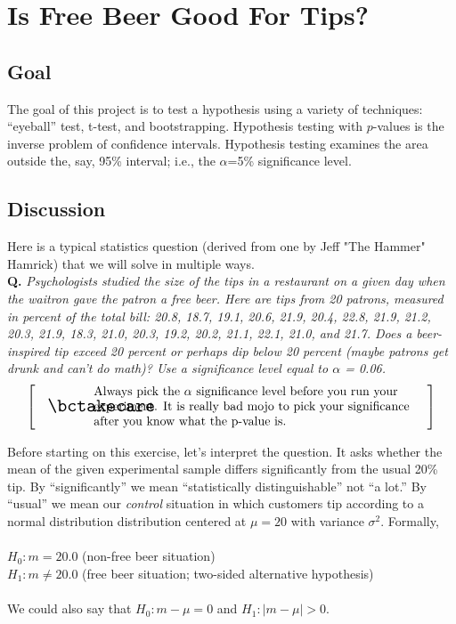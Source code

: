 \documentclass[titlepage]{tufte-book}
\makeatletter
\newcounter{problem}
\newcounter{total}
\newenvironment{callout}[1]{
\[
  \left[
      \begin{tabular}{@{\quad}m{.05\textwidth}@{\qquad}m{.75\textwidth}@{\quad}}
        \scalebox{1.5}{#1} & 
          \raggedright%
}
{
      \end{tabular}
    \right]
\]
}
\makeatother
\begin{document}
\chapter{Is Free Beer Good For Tips?}

\setcounter{problem}{1}
\section{Goal}

\begin{fullwidth}

The goal of this project is to test a hypothesis using a variety of techniques: ``eyeball'' test, t-test, and bootstrapping.  Hypothesis testing with $p$-values is the inverse problem of confidence intervals.  Hypothesis testing examines the area outside the, say, 95\% interval; i.e., the $\alpha$=5\% significance level.

\section{Discussion}

Here is a typical statistics question (derived from one by Jeff "The Hammer" Hamrick) that we will solve in multiple ways.\\

{\bf Q.} {\em Psychologists studied the size of the tips in a restaurant on a given day when the waitron gave the patron a free beer. Here are tips from 20 patrons, measured in percent of the total bill: 20.8, 18.7, 19.1, 20.6, 21.9, 20.4, 22.8,
        21.9, 21.2, 20.3, 21.9, 18.3, 21.0, 20.3,
        19.2, 20.2, 21.1, 22.1, 21.0, and 21.7. Does a beer-inspired tip exceed 20 percent or perhaps dip below 20 percent (maybe patrons get drunk and can't do math)? Use a significance level equal to $\alpha$ = 0.06.}\\
        
\begin{callout}{\bctakecare}
Always pick the $\alpha$ significance level before you run your experiment. It is really bad mojo to pick your significance after you know what the p-value is.
\end{callout}

Before starting on this exercise, let's interpret the question. It asks whether the mean of the given experimental sample differs significantly from the usual 20\% tip. By ``significantly'' we mean ``statistically distinguishable'' not ``a lot.'' By ``usual'' we mean our {\em control} situation in which customers tip according to a normal distribution distribution centered at $\mu=20$ with variance $\sigma^2$. Formally,\\
~\\
$H_0: m = 20.0$ (non-free beer situation)\\
$H_1: m \neq 20.0$ (free beer situation; two-sided alternative hypothesis)\\
~\\
\noindent We could also say that $H_0: m - \mu = 0$ and $H_1: |m-\mu| > 0$.


\end{fullwidth}
\end{document}
